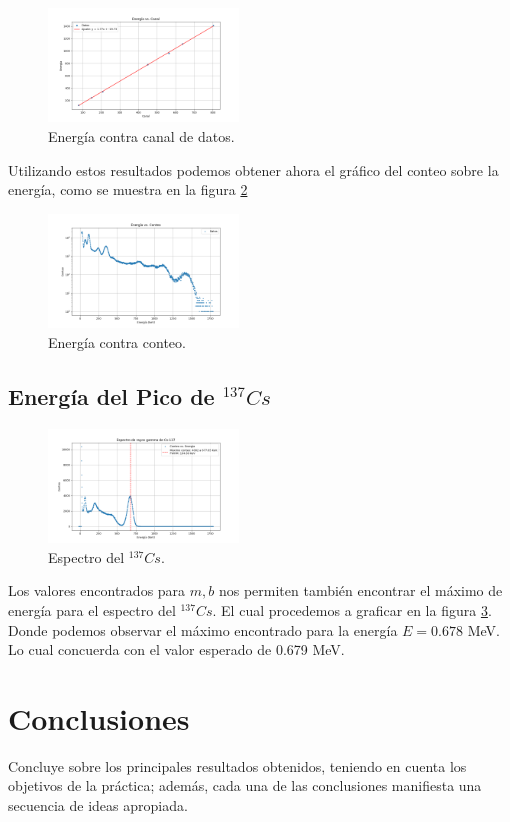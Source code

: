 \documentclass[twocolumn,a4paper,11pt]{scrartcl}
\begin{document}
\begin{figure}[]
  \includegraphics[width=0.45\textwidth]{energy_vs_canal.png}
  \caption{Energía contra canal de datos.}
  \label{fig:energia_canal_graph}
\end{figure}

Utilizando estos resultados podemos obtener ahora el gráfico del conteo sobre la energía, como se muestra en la figura \ref{fig:energia_conteo_graph} 

\begin{figure}[]
  \includegraphics[width=0.45\textwidth]{energia_vs_conteo_eu-152.png}
  \caption{Energía contra conteo.}
  \label{fig:energia_conteo_graph}
\end{figure}

\subsection*{Energía del Pico de $^{137}Cs$}

\begin{figure}[]
  \includegraphics[width=0.45\textwidth]{plot_cs137.png}
  \caption{Espectro del $^{137}Cs$.}
  \label{fig:espectro_cs}
\end{figure}

Los valores encontrados para $m, b$ nos permiten también encontrar el máximo de energía para el espectro del $^{137}Cs$. El cual procedemos a graficar en la figura \ref{fig:espectro_cs}. Donde podemos observar el máximo encontrado para la energía $E= 0.678$ MeV. Lo cual concuerda con el valor esperado de 0.679 MeV.



\section{Conclusiones}
Concluye sobre los principales resultados obtenidos, teniendo en cuenta los objetivos de la práctica; además, cada una de las conclusiones manifiesta una secuencia de ideas apropiada.


 
\end{document}
